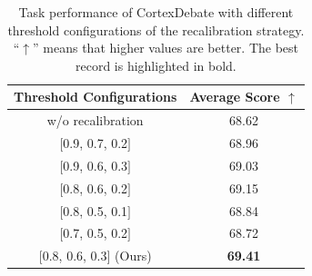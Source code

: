 \begin{table}
  \centering
  \setlength{\tabcolsep}{2mm}
\begin{tabular}{cc}
\toprule
Threshold Configurations     & Average Score $\uparrow$ \\ \midrule
w/o recalibration  & 68.62    \\
$[$0.9, 0.7, 0.2$]$    & 68.96    \\
$[$0.9, 0.6, 0.3$]$    & 69.03    \\
$[$0.8, 0.6, 0.2$]$    & 69.15    \\
$[$0.8, 0.5, 0.1$]$    & 68.84    \\
$[$0.7, 0.5, 0.2$]$    & 68.72    \\
$[$0.8, 0.6, 0.3$]$ (Ours)    & \textbf{69.41}    \\
  \bottomrule
\end{tabular}
  \caption{\label{confidence}
   Task performance of CortexDebate with different threshold configurations of the recalibration strategy. ``$\uparrow$'' means that higher values are better. The best record is highlighted in bold.
  }
\end{table}
